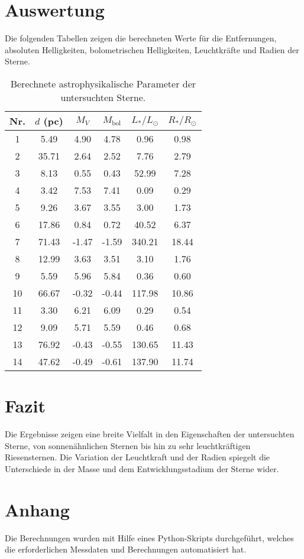 \documentclass[a4paper,12pt]{article}
\begin{document}
\section*{Auswertung}
Die folgenden Tabellen zeigen die berechneten Werte für die Entfernungen, absoluten Helligkeiten, bolometrischen Helligkeiten, Leuchtkräfte und Radien der Sterne.

\begin{table}[H]
    \centering
    \begin{tabular}{cccccc}
        \toprule
        Nr. & \( d \) (pc) & \( M_V \) & \( M_{\text{bol}} \) & \( L_* / L_\odot \) & \( R_* / R_\odot \) \\
        \midrule
        1  & 5.49  & 4.90 & 4.78 & 0.96  & 0.98 \\
        2  & 35.71 & 2.64 & 2.52 & 7.76  & 2.79 \\
        3  & 8.13  & 0.55 & 0.43 & 52.99 & 7.28 \\
        4  & 3.42  & 7.53 & 7.41 & 0.09  & 0.29 \\
        5  & 9.26  & 3.67 & 3.55 & 3.00  & 1.73 \\
        6  & 17.86 & 0.84 & 0.72 & 40.52 & 6.37 \\
        7  & 71.43 & -1.47 & -1.59 & 340.21 & 18.44 \\
        8  & 12.99 & 3.63 & 3.51 & 3.10  & 1.76 \\
        9  & 5.59  & 5.96 & 5.84 & 0.36  & 0.60 \\
        10 & 66.67 & -0.32 & -0.44 & 117.98 & 10.86 \\
        11 & 3.30  & 6.21 & 6.09 & 0.29  & 0.54 \\
        12 & 9.09  & 5.71 & 5.59 & 0.46  & 0.68 \\
        13 & 76.92 & -0.43 & -0.55 & 130.65 & 11.43 \\
        14 & 47.62 & -0.49 & -0.61 & 137.90 & 11.74 \\
        \bottomrule
    \end{tabular}
    \caption{Berechnete astrophysikalische Parameter der untersuchten Sterne.}
    \label{tab:results}
\end{table}

\section*{Fazit}
Die Ergebnisse zeigen eine breite Vielfalt in den Eigenschaften der untersuchten Sterne, von sonnenähnlichen Sternen bis hin zu sehr leuchtkräftigen Riesensternen. Die Variation der Leuchtkraft und der Radien spiegelt die Unterschiede in der Masse und dem Entwicklungsstadium der Sterne wider.
\section*{Anhang}
Die Berechnungen wurden mit Hilfe eines Python-Skripts durchgeführt, welches die erforderlichen Messdaten und Berechnungen automatisiert hat.
\end{document}
